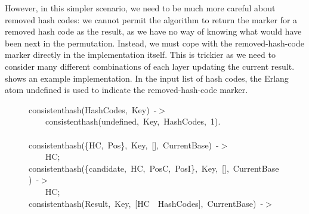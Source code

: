 \documentclass[runningheads,a4paper]{llncs}
\newcommand{\hlstd}[1]{\textcolor[rgb]{0,0,0}{#1}}
\newcommand{\hlnum}[1]{\textcolor[rgb]{0.69,0.49,0}{#1}}
\newcommand{\hlopt}[1]{\textcolor[rgb]{0,0,0}{#1}}
\newcommand{\hlkwd}[1]{\textcolor[rgb]{0,0,0.51}{#1}}
\begin{document}
However, in this simpler scenario, we need to be much more careful
about removed hash codes: we cannot permit the algorithm to return the
marker for a removed hash code as the result, as we have no way of
knowing what would have been next in the permutation. Instead, we must
cope with the removed-hash-code marker directly in the implementation
itself. This is trickier as we need to consider many different
combinations of each layer updating the current result.
 shows an example
implementation. In the input list of hash codes, the Erlang atom
{\ttfamily\hlstd{undefined}\normalfont} is used to indicate the
removed-hash-code marker.

\begin{figure}
\noindent
\ttfamily
\hlkwd{consistent\textunderscore hash}\hlstd{}\hlopt{(}\hlstd{HashCodes}\hlopt{,\ }\hlstd{Key}\hlopt{)\ {-}$>$}\hspace*{\fill}\\
\hlstd{}\hlstd{\ \ \ \ }\hlstd{}\hlkwd{consistent\textunderscore hash}\hlstd{}\hlopt{(}\hlstd{undefined}\hlopt{,\ }\hlstd{Key}\hlopt{,\ }\hlstd{HashCodes}\hlopt{,\ }\hlstd{}\hlnum{1}\hlstd{}\hlopt{).}\hspace*{\fill}\\
\hlstd{}\hspace*{\fill}\\
\hlkwd{consistent\textunderscore hash}\hlstd{}\hlopt{(\{}\hlstd{HC}\hlopt{,\ }\hlstd{\textunderscore Pos}\hlopt{\},\ }\hlstd{\textunderscore Key}\hlopt{,\ {[}{]},\ }\hlstd{\textunderscore CurrentBase}\hlopt{)\ {-}$>$}\hspace*{\fill}\\
\hlstd{}\hlstd{\ \ \ \ }\hlstd{HC}\hlopt{;}\hspace*{\fill}\\
\hlstd{}\hlkwd{consistent\textunderscore hash}\hlstd{}\hlopt{(\{}\hlstd{candidate}\hlopt{,\ }\hlstd{HC}\hlopt{,\ }\hlstd{\textunderscore PosC}\hlopt{,\ }\hlstd{\textunderscore PosI}\hlopt{\},\ }\hlstd{\textunderscore Key}\hlopt{,\ {[}{]},\ }\hlstd{\textunderscore CurrentBase}\hlopt{)\ {-}$>$}\hspace*{\fill}\\
\hlstd{}\hlstd{\ \ \ \ }\hlstd{HC}\hlopt{;}\hspace*{\fill}\\
\hlstd{}\hlkwd{consistent\textunderscore hash}\hlstd{}\hlopt{(}\hlstd{Result}\hlopt{,\ }\hlstd{Key}\hlopt{,\ {[}}\hlstd{HC\ \textbar \ HashCodes}\hlopt{{]},\ }\hlstd{CurrentBase}\hlopt{)\ {-}$>$}\hspace*{\fill}\\

\end{figure}
\end{document}
